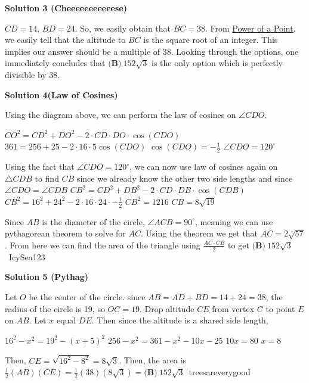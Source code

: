 \begin{enumerate}
 



\textbf{Solution 3 (Cheeeeeeeeeeese)}

$CD = 14$, $BD = 24$. So, we easily obtain that $BC = 38$. From \href{https://artofproblemsolving.com/wiki/index.php?title=Power\_of\_a\_Point\_Theorem\#Intersecting\_Chord\_Theorem\_(Quite\_Simpler)}{Power of a Point}, we easily tell that the altitude to $BC$ is the square root of an integer. This implies our answer should be a multiple of 38. Looking through the options, one immediately concludes that $\boxed{\textbf{(B)}~152\sqrt{3}}$ is the only option which is perfectly divisible by 38.

 



\textbf{Solution 4(Law of Cosines)}

Using the diagram above, we can perform the law of cosines on $\angle CDO$.

 $CO^{2}=CD^{2}+DO^{2}-2\cdot CD\cdot DO\cdot\cos\left(CDO\right)$
$361=256+25-2\cdot16\cdot5\cos\left(CDO\right)$
$\cos\left(CDO\right)=-\frac{1}{2}$
$\angle CDO=120^\circ$

 Using the fact that $\angle CDO=120^\circ$, we can now use law of cosines again on $\triangle CDB$ to find $CB$ since we already know the other two side lengths and since $\angle CDO= \angle CDB$
$CB^{2}=CD^{2}+DB^{2}-2\cdot CD\cdot DB\cdot\cos\left(CDB\right)$
$CB^{2}=16^{2}+24^{2}-2\cdot16\cdot24\cdot-\frac{1}{2}$
$CB^{2}=1216$
$CB=8\sqrt{19}$

 Since $AB$ is the diameter of the circle, $\angle ACB = 90^\circ$, meaning we can use pythagorean theorem to solve for $AC$. Using the theorem we get that $AC = 2\sqrt{57}$. From here we can find the area of the triangle using $\frac{AC\cdot CB}{2}$ to get $\boxed{\textbf{(B)}~152\sqrt{3}}$~IcySea123

 



\textbf{Solution 5 (Pythag)}

Let $O$ be the center of the circle. since $AB = AD + BD = 14+24=38$, the radius of the circle is 19, so $OC = 19$. Drop altitude $CE$ from vertex $C$ to point $E$ on $AB$. Let $x$ equal $DE$. Then since the altitude is a shared side length,

 $16^{2}-x^{2}=19^{2}-(x+5)^{2}$
$256-x^{2}=361-x^{2}-10x-25$
$10x=80$
$x=8$

 Then, $CE=\sqrt{16^{2}-8^{2}}=8\sqrt{3}$. Then, the area is $\frac{1}{2}(AB)(CE)=\frac{1}{2}(38)(8\sqrt{3})=\boxed{\textbf{(B)}~152\sqrt{3}}$~treesareverygood


\end{enumerate}
